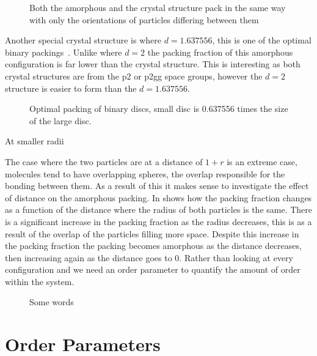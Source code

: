 \begin{figure}
    \label{fig:config:d1r2}
    \caption{Both the amorphous and the crystal structure pack in the same way with only the orientations of particles differing between them}
\end{figure}

Another special crystal structure is where $d=1.637556$, this is one of the optimal binary packings~. Unlike where $d=2$ the packing fraction of this amorphous configuration is far lower than the crystal structure. This is interesting as both crystal structures are from the p2 or p2gg space groups, however the $d=2$ structure is easier to form than the $d=1.637556$.

\begin{figure}
    \caption{Optimal packing of binary discs, small disc is 0.637556 times the size of the large disc.}
    \label{crys:d=1.637556}
\end{figure}

At smaller radii 

The case where the two particles are at a distance of $1+r$ is an extreme case, molecules tend to have overlapping spheres, the overlap responsible for the bonding between them. As a result of this it makes sense to investigate the effect of distance on the amorphous packing. In  shows how the packing fraction changes as a function of the distance where the radius of both particles is the same. There is a significant increase in the packing fraction as the radius decreases, this is as a result of the overlap of the particles filling more space. Despite this increase in the packing fraction the packing becomes amorphous as the distance decreases, then increasing again as the distance goes to 0. Rather than looking at every configuration and we need an order parameter to quantify the amount of order within the system.

\begin{figure}
    \label{fig:var d fix r}
    \caption{Some words}
\end{figure}

\section{Order Parameters}

